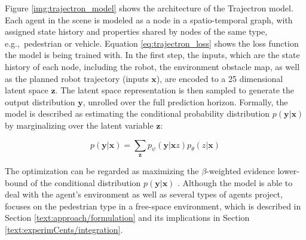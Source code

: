 Figure \ref{img:trajectron_model} shows the architecture of the Trajectron model. Each agent in the scene is modeled as a node in a spatio-temporal graph, with assigned state history and properties shared by nodes of the same type, e.g.,\ pedestrian or vehicle. Equation \ref{eq:trajectron_loss} shows the loss function the model is being trained with. In the first step, the inputs, which are the state history of each node, including the robot, the environment obstacle map, as well as the planned robot trajectory (inputs $\boldsymbol{x}$), are encoded to a 25 dimensional latent space $\boldsymbol{z}$. The latent space representation is then sampled to generate the output distribution $\boldsymbol{y}$, unrolled over the full prediction horizon. Formally, the model is described as estimating the conditional probability distribution $p(\boldsymbol{y}|\boldsymbol{x})$ by marginalizing over the latent variable $\boldsymbol{z}$:

\begin{equation}
p(\boldsymbol{y}|\boldsymbol{x}) = \sum_{\boldsymbol{z}} p_{\psi} (\boldsymbol{y} | \boldsymbol{x} z) p_{\theta}(z | \boldsymbol{x})
\end{equation}

The optimization can be regarded as maximizing the $\beta$-weighted evidence lower-bound of the conditional distribution $p(\boldsymbol{y}|\boldsymbol{x})$ \cite{Ivanovic2018}. Although the model is able to deal with the agent's environment as well as several types of agents project, \project focuses on the pedestrian type in a free-space environment, which is described in Section \ref{text:approach/formulation} and its implications in Section \ref{text:experimCents/integration}.

